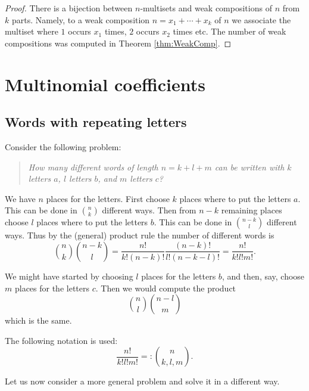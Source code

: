 \begin{page}
\setcounter{section}{4}
\setcounter{subsection}{0}
\setcounter{dfn}{15}
\label{portion:128}

\begin{proof}
There is a bijection between $n$-multisets and weak compositions of $n$ from $k$ parts.
Namely, to a weak composition $n = x_1 + \cdots + x_k$ of $n$ we associate the multiset
where $1$ occurs $x_1$ times, $2$ occurs $x_2$ times etc.
The number of weak compositions was computed in Theorem \ref{thm:WeakComp}.
\end{proof}



\end{page}

\begin{page}
\setcounter{section}{4}
\setcounter{subsection}{1}
\setcounter{dfn}{0}
\label{portion:130}

\section{Multinomial coefficients}

\end{page}

\begin{page}
\setcounter{section}{4}
\setcounter{subsection}{1}
\setcounter{dfn}{0}
\label{portion:132}

\subsection{Words with repeating letters}
Consider the following problem:
\begin{quote}
\emph{How many different words of length $n=k+l+m$ can be written with $k$ letters $a$, $l$ letters $b$, and $m$ letters $c$?}
\end{quote}

We have $n$ places for the letters.
First choose $k$ places where to put the letters $a$.
This can be done in $\binom{n}{k}$ different ways.
Then from $n-k$ remaining places choose $l$ places where to put the letters $b$.
This can be done in $\binom{n-k}{l}$ different ways.
Thus by the (general) product rule the number of different words is
\[
\binom{n}{k} \binom{n-k}{l} = \frac{n!}{k!(n-k)!} \frac{(n-k)!}{l!(n-k-l)!} = \frac{n!}{k!l!m!}.
\]

We might have started by choosing $l$ places for the letters $b$, and then, say, choose $m$ places for the letters $c$.
Then we would compute the product
\[
\binom{n}{l} \binom{n-l}{m}
\]
which is the same.

The following notation is used:
\[
\frac{n!}{k!l!m!} =: \binom{n}{k, l, m}.
\]

Let us now consider a more general problem and solve it in a different way.


\end{page}


